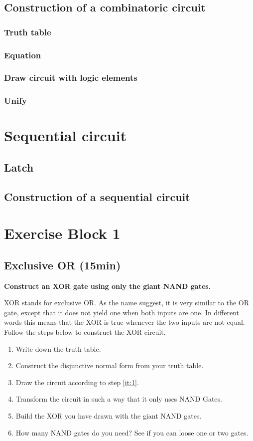\documentclass[10pt,a4paper]{article}
\begin{document}
\subsection{Construction of a combinatoric circuit}
\subsubsection{Truth table}
\subsubsection{Equation}
\subsubsection{Draw circuit with logic elements}
\subsubsection{Unify}

\section{Sequential circuit}
\subsection{Latch}
\subsection{Construction of a sequential circuit}


\newpage
\section{Exercise Block 1}

\subsection{Exclusive OR (15min)}\label{subsec:ex-1}
\textbf{Construct an XOR gate using only the giant NAND gates.}

 XOR stands for exclusive OR. As the name suggest, it is very similar to the OR gate, except that it does not yield one when both inputs are one. In different words this means that the XOR is true whenever the two inputs are not equal. Follow the steps below to construct the XOR circuit.
\begin{enumerate}
	\item Write down the truth table.
	\item\label{it:1} Construct the disjunctive normal form from your truth table.
	\item Draw the circuit according to step \ref{it:1}.
	\item Transform the circuit in such a way that it only uses NAND Gates.
	\item Build the XOR you have drawn with the giant NAND gates.
	\item How many NAND gates do you need? See if you can loose one or two gates.
\end{enumerate}
\end{document}
